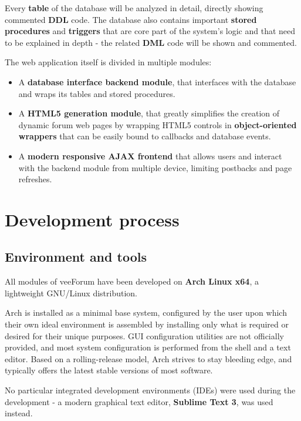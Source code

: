 \documentclass[12pt]{report}
\renewcommand\emph{\textbf}
\begin{document}
        Every \emph{table} of the database will be analyzed in detail, directly showing commented \emph{DDL} code. The database also contains important \emph{stored procedures} and \emph{triggers} that are core part of the system's logic and that need to be explained in depth - the related \emph{DML} code will be shown and commented.

        The web application itself is divided in multiple modules:
        \begin{itemize}
            \item A \emph{database interface backend module}, that interfaces with the database and wraps its tables and stored procedures.
            \item A \emph{HTML5 generation module}, that greatly simplifies the creation of dynamic forum web pages by wrapping HTML5 controls in \emph{object-oriented wrappers} that can be easily bound to callbacks and database events.
            \item A \emph{modern responsive AJAX frontend} that allows users and interact with the backend module from multiple device, limiting postbacks and page refreshes.
        \end{itemize}

        \chapter{Development process}

            \section{Environment and tools}
                All modules of veeForum have been developed on \emph{Arch Linux x64}, a lightweight GNU/Linux distribution.

                Arch is installed as a minimal base system, configured by the user upon which their own ideal environment is assembled by installing only what is required or desired for their unique purposes. GUI configuration utilities are not officially provided, and most system configuration is performed from the shell and a text editor. Based on a rolling-release model, Arch strives to stay bleeding edge, and typically offers the latest stable versions of most software.

                No particular integrated development environments (IDEs) were used during the development - a modern graphical text editor, \emph{Sublime Text 3}, was used instead.
\end{document}
